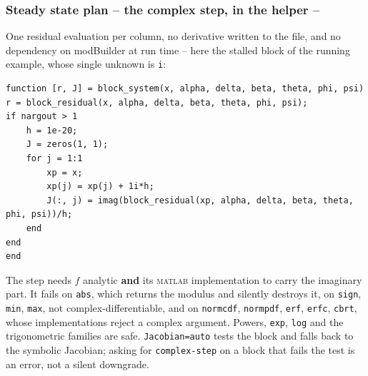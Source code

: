\documentclass[10pt,slidestop]{beamer}
\theoremstyle{plain}
\begin{document}
\begin{frame}[c,fragile]
  \frametitle{Steady state plan -- the complex step, in the helper --}

  One residual evaluation per column, no derivative written to the file, and no
  dependency on modBuilder at run time -- here the stalled block of the running
  example, whose single unknown is \verb+i+:

  \medskip
  \begin{lstlisting}[style=MatlabConsole,basicstyle=\ttfamily\tiny]
function [r, J] = block_system(x, alpha, delta, beta, theta, phi, psi)
r = block_residual(x, alpha, delta, beta, theta, phi, psi);
if nargout > 1
    h = 1e-20;
    J = zeros(1, 1);
    for j = 1:1
        xp = x;
        xp(j) = xp(j) + 1i*h;
        J(:, j) = imag(block_residual(xp, alpha, delta, beta, theta, phi, psi))/h;
    end
end
end
  \end{lstlisting}

  \small The step needs $f$ analytic \textbf{and} its \textsc{matlab} implementation
  to carry the imaginary part. It fails on \verb+abs+, which returns the modulus and
  silently destroys it, on \verb+sign+, \verb+min+, \verb+max+, not
  complex-differentiable, and on \verb+normcdf+, \verb+normpdf+, \verb+erf+,
  \verb+erfc+, \verb+cbrt+, whose implementations reject a complex argument. Powers,
  \verb+exp+, \verb+log+ and the trigonometric families are safe. \verb+Jacobian=auto+
  tests the block and falls back to the symbolic Jacobian; asking for
  \verb+complex-step+ on a block that fails the test is an error, not a silent
  downgrade.

\end{frame}
\end{document}
